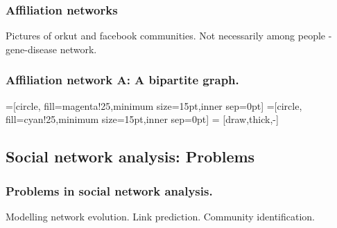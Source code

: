 \documentclass{beamer}
\begin{document}
\begin{frame}
\frametitle{Affiliation networks}
\begin{itemize}
\pitem Pictures of orkut and facebook communities.
\pitem Not necessarily among people - gene-disease network.
\end{itemize}
\end{frame}

\begin{frame}
\frametitle{Affiliation network A: A bipartite graph.}
=[circle, fill=magenta!25,minimum size=15pt,inner sep=0pt]
=[circle, fill=cyan!25,minimum size=15pt,inner sep=0pt]
 = [draw,thick,-]
\begin{center}
\end{center}
\end{frame}

\subsection{Social network analysis: Problems}
\begin{frame}
\frametitle{Problems in social network analysis.}
\begin{itemize}
\pitem Modelling network evolution.
\pitem Link prediction.
\pitem Community identification.
\end{itemize}
\end{frame}
\end{document}
